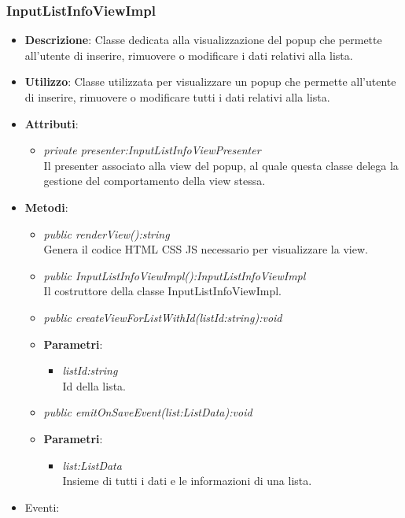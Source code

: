 \subsubsection{InputListInfoViewImpl}
\begin{itemize}
\item \textbf{Descrizione}: Classe dedicata alla visualizzazione del popup che permette all'utente di inserire, rimuovere o modificare i dati relativi alla lista.
\item \textbf{Utilizzo}: Classe utilizzata per visualizzare un popup che permette all'utente di inserire, rimuovere o modificare tutti i dati relativi alla lista.
\item \textbf{Attributi}: 
	\begin{itemize}
	\item \textit{private presenter:InputListInfoViewPresenter}\\
		Il presenter associato alla view del popup, al quale questa classe delega la gestione del comportamento della view stessa.
	\end{itemize}
\item \textbf{Metodi}:
	\begin{itemize}	
	\item \textit{public renderView():string}\\
			Genera il codice HTML CSS JS necessario per visualizzare la view.
	\item \textit{public InputListInfoViewImpl():InputListInfoViewImpl}\\
	Il costruttore della classe InputListInfoViewImpl.
	\item \textit{public createViewForListWithId(listId:string):void}\\
	
			\item{\textbf{Parametri}: \begin{itemize}
			\item \textit{listId:string}\\
			Id della lista.
			\end{itemize}}
	\item \textit{public emitOnSaveEvent(list:ListData):void}\\

			\item{\textbf{Parametri}: \begin{itemize}
			\item \textit{list:ListData}\\
				Insieme di tutti i dati e le informazioni di una lista.
			\end{itemize}}
	\end{itemize}
\item{Eventi}:
\end{itemize}

